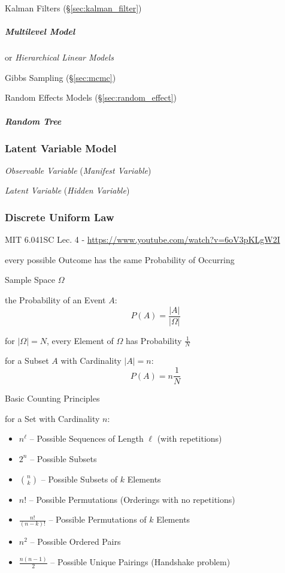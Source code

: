 Kalman Filters (\S\ref{sec:kalman_filter})



\subparagraph{Multilevel Model}\label{sec:multilevel_model}\hfill

or \emph{Hierarchical Linear Models}

Gibbs Sampling (\S\ref{sec:mcmc})

Random Effects Models (\S\ref{sec:random_effect})



\subparagraph{Random Tree}\label{sec:random_tree}\hfill



\subsubsection{Latent Variable Model}\label{sec:latent_variable_model}

\emph{Observable Variable} (\emph{Manifest Variable})

\emph{Latent Variable} (\emph{Hidden Variable})



\subsubsection{Discrete Uniform Law}\label{sec:discrete_uniform_law}

MIT 6.041SC Lec. 4 - \url{https://www.youtube.com/watch?v=6oV3pKLgW2I}

every possible Outcome has the same Probability of Occurring

Sample Space $\Omega$

the Probability of an Event $A$:
\[
  P(A) = \frac{|A|}{|\Omega|}
\]

for $|\Omega| = N$, every Element of $\Omega$ has Probability $\frac{1}{N}$

for a Subset $A$ with Cardinality $|A| = n$:
\[
  P(A) = n \frac{1}{N}
\]


Basic Counting Principles

for a Set with Cardinality $n$:
\begin{itemize}
  \item $n^\ell$ -- Possible Sequences of Length $\ell$ (with repetitions)
  \item $2^n$ -- Possible Subsets
  \item $\binom{n}{k}$ -- Possible Subsets of $k$ Elements
  \item $n!$ -- Possible Permutations (Orderings with no repetitions)
  \item $\frac{n!}{(n-k)!}$ -- Possible Permutations of $k$ Elements
  \item $n^2$ -- Possible Ordered Pairs
  \item $\frac{n(n-1)}{2}$ -- Possible Unique Pairings (Handshake problem)
\end{itemize}


